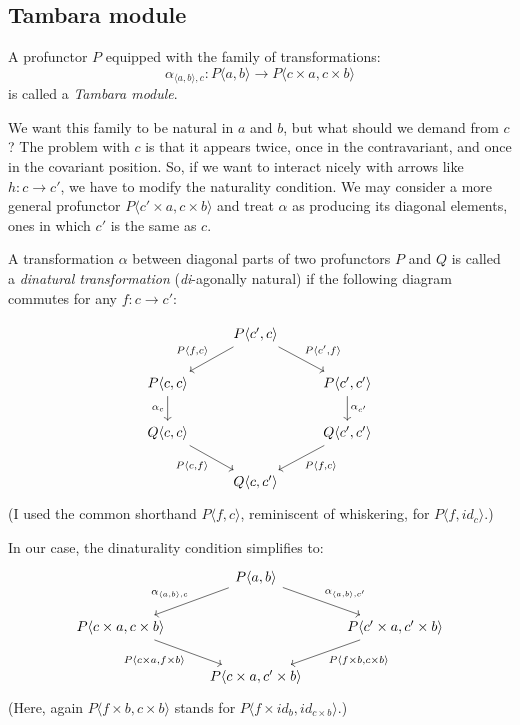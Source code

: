 \documentclass[DaoFP]{subfiles}
\begin{document}
\subsection{Tambara module}

A profunctor $P$ equipped with the family of transformations:
\[ \alpha_{\langle a, b\rangle, c} \colon P \langle a, b \rangle \to P \langle c \times a, c \times b \rangle \]
is called a \emph{Tambara module}. 

We want this family to be natural in $a$ and $b$, but what should we demand from $c$? The problem with $c$ is that it appears twice, once in the contravariant, and once in the covariant position. So, if we want to interact nicely with arrows like $h \colon c \to c'$, we have to modify the naturality condition. We may consider a more general profunctor $P \langle c' \times a, c \times b \rangle$ and treat $\alpha$ as producing its diagonal elements, ones in which $c'$ is the same as $c$. 

A transformation $\alpha$ between diagonal parts of two profunctors $P$ and $Q$ is called a \emph{dinatural transformation} (\emph{di}-agonally natural) if the following diagram commutes for any $f \colon c \to c'$:

\[
 \begin{tikzcd}
 & P \langle c', c \rangle
 \arrow[dl, "{P \langle f, c \rangle}"']
 \arrow[dr, "{P \langle c', f \rangle}"]
 \\
 P \langle c, c \rangle 
  \arrow[d, "\alpha_c"']
 && P \langle c', c' \rangle
 \arrow[d, "\alpha_{c'}"]
 \\
 Q \langle c, c \rangle
   \arrow[dr, "{P \langle c, f \rangle}"']
 &&  Q \langle c', c' \rangle
 \arrow[dl,"{P \langle f, c \rangle}"]
\\
&Q \langle c, c' \rangle
 \end{tikzcd}
\]
(I used the common shorthand $P \langle f, c \rangle$, reminiscent of whiskering, for $P \langle f, id_c \rangle$.)

In our case, the dinaturality condition simplifies to:
\[
 \begin{tikzcd}
 & P \langle a, b \rangle
 \arrow[dl, "{\alpha_{\langle a, b \rangle, c}}"']
 \arrow[dr, "{\alpha_{\langle a, b \rangle, c'}}"]
 \\
 P \langle c \times a, c \times b \rangle
   \arrow[dr, "{P \langle c \times a, f \times b \rangle}"']
 &&  P \langle c' \times a, c'  \times b\rangle
 \arrow[dl,"{P \langle f \times b, c \times b \rangle}"]
\\
&P \langle c \times a, c' \times b \rangle
 \end{tikzcd}
\]
(Here, again $P \langle f \times b, c \times b \rangle$ stands for $P \langle f \times id_b, id_{c \times b} \rangle$.)
\end{document}
